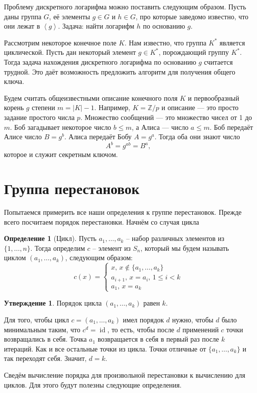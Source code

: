 \documentclass[10pt,a4paper,oneside]{book}
\theoremstyle{definition}
\newtheorem*{defn}{\color{yellow!30!red} Определение}
\newtheorem{utvr}{\color{blue!50!black}Утверждение}
\renewcommand{\leq}{\leqslant}
\newcommand{\mb}[1]{\mathbb{#1}}
\newcommand{\id}{\operatorname{id}}
\def\lan{\left\langle }
\def\ran{\right\rangle}
\def\dfn{\begin{defn}}
\def\edfn{\end{defn}}
\def\utv{\begin{utvr}}
\def\eutv{\end{utvr}}
\begin{document}
Проблему дискретного логарифма можно поставить следующим образом. Пусть даны группа $G$, её элементы $g\in G$ и $h\in G$, про которые заведомо известно, что они лежат в $\lan g\ran$. Задача: найти логарифм $h$ по основанию $g$.


Рассмотрим некоторое конечное поле $K$. Нам известно, что группа $K^*$ является циклической. Пусть дан некоторый элемент $g\in K^*$, порождающий группу $K^*$. Тогда задача нахождения дискретного логарифма по основанию $g$ считается трудной. Это даёт возможность предложить  алгоритм для получения общего ключа.

Будем считать общеизвестными описание конечного поля $K$ и первообразный корень $g$ степени $m=|K|-1$. Например, $K=\mb Z/p$ и описание --- это просто задание простого числа $p$. Множество сообщений --- это множество чисел от 1 до $m$. Боб загадывает некоторое число $b\leq m$, а Алиса --- число $a\leq m$. Боб передаёт Алисе число $B=g^b$. Алиса передаёт Бобу $A=g^a$. Тогда оба они знают число 
$$A^b=g^{ab}=B^a,$$
которое и служит секретным ключом.
 

\section{Группа перестановок}

Попытаемся примерить все наши определения к группе перестановок. Прежде всего посчитаем порядок перестановки. Начнём со случая цикла


\dfn[Цикл] Пусть $a_1,\dots,a_k$ -- набор различных элементов из $\{1,\dots,n\}$. Тогда определим $c$ -- элемент из $S_n$, который мы будем называть циклом $(a_1,\dots,a_k)$, следующим образом:
$$c(x)=\begin{cases}
x,\, x \notin \{a_1,\dots,a_k\}\\
a_{i+1},\, x=a_i,\, 1\leq i < k\\
a_1,\, x=a_k
\end{cases}$$
\edfn

\utv Порядок цикла $(a_1,\dots,a_k)$ равен $k$.
\eutv
\proof Для того, чтобы цикл $c=(a_1,\dots,a_k)$ имел порядок $d$ нужно, чтобы $d$ было минимальным таким, что $c^d=\id$, то есть, чтобы после $d$ применений $c$ точки возвращались в себя. Точка $a_1$ возвращается в себя в первый раз после $k$ итераций. Как и все остальные точки из цикла. Точки отличные от $\{a_1,\dots,a_k\}$ и так переходят себя. Значит, $d=k$. 
\endproof

Сведём вычисление порядка для произвольной перестановки к вычислению для циклов. Для этого будут полезны следующие определения.
\end{document}
